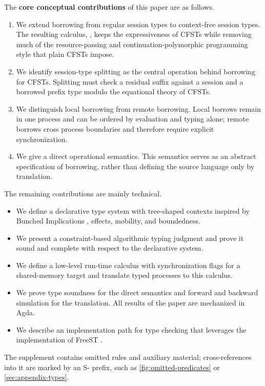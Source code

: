 \medskip%

The \textbf{core conceptual contributions} of this paper are as follows.
\begin{enumerate}
\item We extend borrowing from regular session types to context-free
  session types. The resulting calculus, \thecalculus, keeps the
  expressiveness of CFSTs while removing much of the
  resource-passing and continuation-polymorphic programming style that
  plain CFSTs impose.
\item We identify session-type splitting as the central operation
  behind borrowing for CFSTs. Splitting must check a residual suffix
  against a session and a borrowed prefix type modulo the equational
  theory of CFSTs.
\item We distinguish local borrowing from remote borrowing. Local
  borrows remain in one process and can be ordered by evaluation and
  typing alone; remote borrows cross process boundaries and therefore
  require explicit synchronization.
\item We give \thecalculus a direct operational semantics. This
  semantics serves as an abstract specification of borrowing, rather
  than defining the source language only by translation.
\end{enumerate}

The remaining contributions are mainly technical.
\begin{itemize}
\item We define a declarative type system with tree-shaped contexts inspired by
  Bunched Implications \cite{DBLP:journals/bsl/OHearnP99}, effects, mobility, and
  boundedness.
\item We present a constraint-based algorithmic typing judgment and prove it
  sound and complete with respect to the declarative system.
\item We define a low-level run-time calculus with synchronization flags for a
  shared-memory target and translate typed
  \thecalculus processes to this calculus.
\item We prove type soundness for the direct semantics and forward and
  backward simulation for the translation. All results of the paper are
  mechanized in Agda.
\item We describe an implementation path for type checking that
  leverages the implementation of FreeST
  \cite{almeida26:_frees_concur_progr_languag_with,DBLP:journals/corr/abs-1904-01284}.
\end{itemize}

The supplement contains omitted rules and auxiliary material;
cross-references into it are marked by an \textup{S-} prefix, such as
\cref{fig:omitted-predicates} or \cref{sec:appendix-types}.

